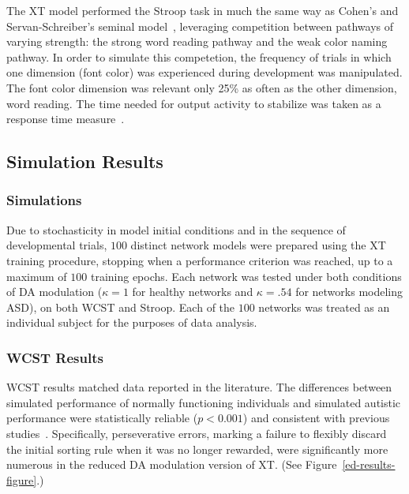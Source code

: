The XT model performed the Stroop task in much the same way as Cohen's and Servan-Schreiber's seminal model~\cite{CohenJD:1990:Stroop}, leveraging competition between pathways of varying strength: the strong word reading pathway and the weak color naming pathway. In order to simulate this competetion, the frequency of trials in which one dimension (font color) was experienced during development was manipulated. The font color dimension was relevant only 25\% as often as the other dimension, word reading. The time needed for output activity to stabilize was taken as a response time measure~\cite{RougierNP:2005:XT}.

\subsection{Simulation Results}

\subsubsection{Simulations} 
Due to stochasticity in model initial conditions and in the sequence of developmental trials, $100$ distinct network models were prepared using the XT training procedure, stopping when a performance criterion was reached, up to a maximum of $100$ training epochs.  Each network was tested under both conditions of DA modulation ($\kappa = 1$ for healthy networks and $\kappa = .54$ for networks modeling ASD), on both WCST and Stroop. Each of the $100$ networks was treated as an individual subject for the purposes of data analysis.

\subsubsection{WCST Results} 
WCST results matched data reported in the literature. The differences between simulated performance of normally functioning individuals and simulated autistic performance were statistically reliable ($p < 0.001$) and consistent with previous studies~\cite{PriorMR:1990:AutismWCST,Ozonoff:1999:AutismStroopWCST,MinshewNJ:2002:AutismWCST}. Specifically, perseverative errors, marking a failure to flexibly discard the initial sorting rule when it was no longer rewarded, were significantly more numerous in the reduced DA modulation version of XT. (See Figure~\ref{ed-results-figure}.)

